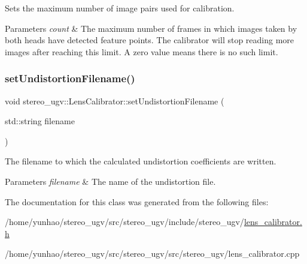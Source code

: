 Sets the maximum number of image pairs used for calibration. 


\begin{DoxyParams}{Parameters}
{\em count} & The maximum number of frames in which images taken by both heads have detected feature points. The calibrator will stop reading more images after reaching this limit. A zero value means there is no such limit. \\
\hline
\end{DoxyParams}
\mbox{\label{classstereo__ugv_1_1LensCalibrator_a4debdb4b31e7b474576269cc15da15d7}} 
\subsubsection{\texorpdfstring{set\+Undistortion\+Filename()}{setUndistortionFilename()}}
{\footnotesize\ttfamily void stereo\+\_\+ugv\+::\+Lens\+Calibrator\+::set\+Undistortion\+Filename (\begin{DoxyParamCaption}\item[{std\+::string}]{filename }\end{DoxyParamCaption})}



The filename to which the calculated undistortion coefficients are written. 


\begin{DoxyParams}{Parameters}
{\em filename} & The name of the undistortion file. \\
\hline
\end{DoxyParams}


The documentation for this class was generated from the following files\+:\begin{DoxyCompactItemize}
\item 
/home/yunhao/stereo\+\_\+ugv/src/stereo\+\_\+ugv/include/stereo\+\_\+ugv/\hyperlink{lens__calibrator_8h}{lens\+\_\+calibrator.\+h}\item 
/home/yunhao/stereo\+\_\+ugv/src/stereo\+\_\+ugv/src/stereo\+\_\+ugv/lens\+\_\+calibrator.\+cpp\end{DoxyCompactItemize}
